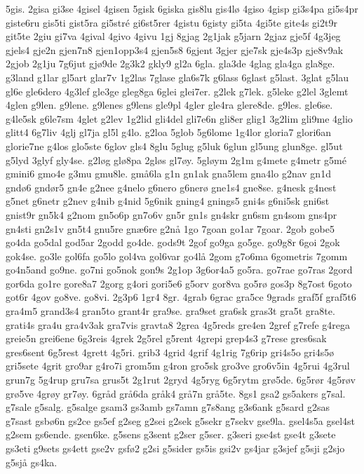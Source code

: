 {5gis.
2gisa
gi3se
4gisel
4gisen
5gisk
6giska
gis8lu
gis4lø
4giso
4gisp
gi3s4pa
gi5s4pr
giste6ru
gis5ti
gist5ra
gi5stré
gi6st5rer
4gistu
6gisty
gi5ta
4gi5te
gite4s
gi2t9r
git5te
2giu
gi7va
4gival
4givo
4givu
1gj
8gjag
2g1jak
g5jarn
2gjaz
gje5f
4g3jeg
gjels4
gje2n
gjen7n8
gjen1opp3s4
gjen5s8
6gjent
3gjer
gje7sk
gje4s3p
gje8v9ak
2gjob
2g1ju
7g6jut
gjø9de
2g3k2
gkly9
gl2a
6gla.
gla3de
4glag
gla4ga
gla8ge.
g3land
g1lar
gl5art
glar7v
1g2las
7glase
gla6s7k
g6lass
6glast
g5last.
3glat
g5lau
gl6e
gle6dero
4g3lef
gle3ge
gleg8ga
6glei
glei7er.
g2lek
g7lek.
g5leke
g2lel
3glemt
4glen
g9len.
g9lene.
g9lenes
g9lens
gle9pl
4gler
gle4ra
glere8de.
g9les.
gle6se.
g4le5sk
g6le7sm
4glet
g2lev
1g2lid
gli4del
gli7e6n
gli8er
glig1
3g2lim
gli9me
4glio
glitt4
6g7liv
4glj
gl7ja
gl5l
g4lo.
g2loa
5glob
5g6lome
1g4lor
gloria7
glori6an
glorie7ne
g4los
glo5ste
6glov
gls4
8glu
5glug
g5luk
6glun
gl5ung
glun8ge.
gl5ut
g5lyd
3glyf
gly4se.
g2løg
glø8pa
2gløs
gl7øy.
5gløym
2g1m
g4mete
g4metr
g5mé
gmini6
gmo4e
g3mu
gmu8le.
gmå6la
g1n
gn1ak
gna5lem
gna4lo
g2nav
gn1d
gndø6
gndør5
gn4e
g2nee
g4nelo
g6nero
g6nerø
gne1s4
gne8se.
g4nesk
g4nest
g5net
g6netr
g2nev
g4nib
g4nid
5g6nik
gning4
gnings5
gni4s
g6ni5sk
gni6st
gnist9r
gn5k4
g2nom
gn5o6p
gn7o6v
gn5r
gn1s
gn4skr
gn6sm
gn4som
gns4pr
gn4sti
gn2s1v
gn5t4
gnu5re
gnæ6re
g2nå
1go
7goan
go1ar
7goar.
2gob
gobe5
go4da
go5dal
god5ar
2godd
go4de.
gods9t
2gof
go9ga
go5ge.
go9g8r
6goi
2gok
gok4se.
go3le
gol6fa
go5lo
gol4va
gol6var
go4lå
2gom
g7o6ma
6gometris
7gomm
go4n5and
go9ne.
go7ni
go5nok
gon9s
2g1op
3g6or4a5
go5ra.
go7rae
go7ras
2gord
gor6da
go1re
gore8a7
2gorg
g4ori
gori5e6
g5orv
gor8va
go5rø
gos3p
8g7ost
6goto
got6r
4gov
go8ve.
go8vi.
2g3p6
1gr4
8gr.
4grab
6grac
gra5ce
9grads
graf5f
graf5t6
gra4m5
grand3s4
gran5to
grant4r
gra9se.
gra9set
gra6sk
gras3t
gra5t
gra8te.
grati4s
gra4u
gra4v3ak
gra7vis
gravta8
2grea
4g5reds
gre4en
2gref
g7refe
g4rega
greie5n
grei6ene
6g3reis
4grek
2g5rel
g5rent
4grepi
grep4s3
g7rese
gres6sak
gres6sent
6g5rest
4grett
4g5ri.
grib3
4grid
4grif
4g1rig
7g6rip
gri4s5o
gri4s5ø
gri5sete
4grit
gro9ar
g4ro7i
grom5m
g4ron
gro5sk
gro3ve
gro6v5in
4g5rui
4g3rul
grun7g
5g4rup
gru7sa
grus5t
2g1rut
2gryd
4g5ryg
6g5rytm
grø5de.
6g5rør
4g5røv
grø5ve
4grøy
gr7øy.
6gråd
grå6da
gråk4
grå7n
grå5te.
8gs1
gsa2
gs5akers
g7sal.
g7sale
g5salg.
g5salge
gsam3
gs3amb
gs7amn
g7s8ang
g3s6ank
g5sard
g2sas
g7sast
gsbø6n
gs2ce
gs5ef
g2seg
g2sei
g2sek
g5sekr
g7sekv
gse9la.
gsel4s5a
gsel4st
g2sem
gs6ende.
gsen6ke.
g5sens
g3sent
g2ser
g5ser.
g3seri
gse4st
gse4t
g3sete
gs3eti
g9sets
gs4ett
gse2v
gsfø2
g2si
g5sider
gs5is
gsi2v
gs4jar
g3sjef
g5sji
g2sjo
g5sjå
gs4ka.
}
